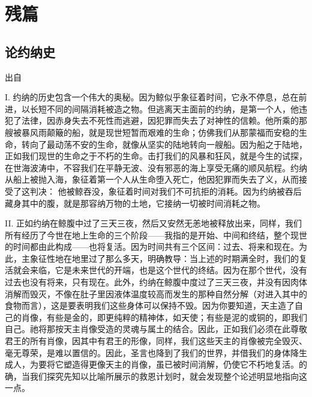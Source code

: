 
\chapter{残篇}



\section{论约纳史}

出自\par

I. 约纳的历史包含一个伟大的奥秘。因为鲸似乎象征着时间，它永不停息，总在前进，以长短不同的间隔消耗被造之物。但逃离天主面前的约纳，是第一个人，他违犯了法律，因赤身失去不死性而逃避，因犯罪而失去了对神性的信赖。他所乘的那艘被暴风雨颠簸的船，就是现世短暂而艰难的生命；仿佛我们从那蒙福而安稳的生命，转向了最动荡不安的生命，就像从坚实的陆地转向一艘船。因为船之于陆地，正如我们现世的生命之于不朽的生命。击打我们的风暴和狂风，就是今生的试探，在世海波涛中，不容我们在平静无波、没有邪恶的海上享受无痛的顺风航程。约纳从船上被抛入海，象征着第一个人从生命堕入死亡，他因犯罪而失去了义，从而接受了这判决： 他被鲸吞没，象征着时间对我们不可抗拒的消耗。因为约纳被吞后藏身其中的腹，就是那容纳万物的土地，它接纳一切被时间消耗之物。\par

II. 正如约纳在鲸腹中过了三天三夜，然后又安然无恙地被释放出来，同样，我们所有经历了今世在地上生命的三个阶段——我指的是开始、中间和终结，整个现世的时间都由此构成——也将复活。因为时间共有三个区间：过去、将来和现在。为此，主象征性地在地里过了那么多天，明确教导：当上述的时期满全时，我们的复活就会来临，它是未来世代的开端，也是这个世代的终结。因为在那个世代，没有过去也没有将来，只有现在。此外，约纳在鲸腹中度过了三天三夜，并没有因肉体消解而毁灭，不像在肚子里因液体温度较高而发生的那种自然分解（对进入其中的食物而言），这是要表明我们这些身体可以保持不毁。因为你要知道，天主造了自己的肖像，有些是金的，即更纯粹的精神体，如天使；有些是泥的或铜的，即我们自己。祂将那按天主肖像受造的灵魂与属土的结合。因此，正如我们必须在此尊敬君王的所有肖像，因其中有君王的形像，同样，我们这些天主的肖像被完全毁灭、毫无尊荣，是难以置信的。因此，圣言也降到了我们的世界，并借我们的身体降生成人，为要将它塑造得更像天主的肖像，虽已被时间消解，仍使它不朽地复活。的确，当我们探究先知以比喻所展示的救恩计划时，就会发现整个论述明显地指向这一点。\par

